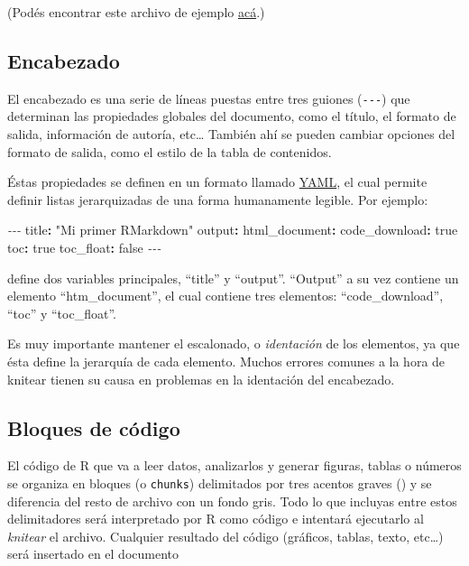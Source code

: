 \documentclass[
  openany]{book}
\newenvironment{Shaded}{\begin{snugshade}}{\end{snugshade}}
\newcommand{\AttributeTok}[1]{\textcolor[rgb]{0.77,0.63,0.00}{#1}}
\newcommand{\CharTok}[1]{\textcolor[rgb]{0.31,0.60,0.02}{#1}}
\newcommand{\FunctionTok}[1]{\textcolor[rgb]{0.00,0.00,0.00}{#1}}
\newcommand{\KeywordTok}[1]{\textcolor[rgb]{0.13,0.29,0.53}{\textbf{#1}}}
\newcommand{\PreprocessorTok}[1]{\textcolor[rgb]{0.56,0.35,0.01}{\textit{#1}}}
\newcommand{\StringTok}[1]{\textcolor[rgb]{0.31,0.60,0.02}{#1}}
\begin{document}
(Podés encontrar este archivo de ejemplo \href{files/mi-primer-rmarkdown.Rmd}{acá}.)

\hypertarget{encabezado}{%
\subsection{Encabezado}\label{encabezado}}

El encabezado es una serie de líneas puestas entre tres guiones (\texttt{-\/-\/-}) que determinan las propiedades globales del documento, como el título, el formato de salida, información de autoría, etc\ldots{} También ahí se pueden cambiar opciones del formato de salida, como el estilo de la tabla de contenidos.

Éstas propiedades se definen en un formato llamado \href{https://es.wikipedia.org/wiki/YAML}{YAML}, el cual permite definir listas jerarquizadas de una forma humanamente legible.
Por ejemplo:

\begin{Shaded}
\begin{Highlighting}[]
\PreprocessorTok{{-}{-}{-}}
\FunctionTok{title}\KeywordTok{:}\AttributeTok{ }\StringTok{"Mi primer RMarkdown"}
\FunctionTok{output}\KeywordTok{:}\AttributeTok{ }
\AttributeTok{  }\FunctionTok{html\_document}\KeywordTok{:}
\AttributeTok{    }\FunctionTok{code\_download}\KeywordTok{:}\AttributeTok{ }\CharTok{true}
\AttributeTok{    }\FunctionTok{toc}\KeywordTok{:}\AttributeTok{ }\CharTok{true}
\AttributeTok{    }\FunctionTok{toc\_float}\KeywordTok{:}\AttributeTok{ }\CharTok{false}
\PreprocessorTok{{-}{-}{-}}
\end{Highlighting}
\end{Shaded}

define dos variables principales, ``title'' y ``output''.
``Output'' a su vez contiene un elemento ``htm\_document'', el cual contiene tres elementos: ``code\_download'', ``toc'' y ``toc\_float''.

Es muy importante mantener el escalonado, o \emph{identación} de los elementos, ya que ésta define la jerarquía de cada elemento.
Muchos errores comunes a la hora de knitear tienen su causa en problemas en la identación del encabezado.

\hypertarget{bloques-de-cuxf3digo}{%
\subsection{Bloques de código}\label{bloques-de-cuxf3digo}}

El código de R que va a leer datos, analizarlos y generar figuras, tablas o números se organiza en bloques (o \texttt{chunks}) delimitados por tres acentos graves (\texttt{\textasciigrave{}\textasciigrave{}\textasciigrave{}}) y se diferencia del resto de archivo con un fondo gris.
Todo lo que incluyas entre estos delimitadores será interpretado por R como código e intentará ejecutarlo al \emph{knitear} el archivo.
Cualquier resultado del código (gráficos, tablas, texto, etc\ldots) será insertado en el documento
\end{document}
